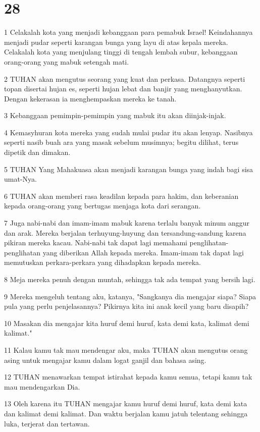 \chapter{28}

\par 1 Celakalah kota yang menjadi kebanggaan para pemabuk Israel! Keindahannya menjadi pudar seperti karangan bunga yang layu di atas kepala mereka. Celakalah kota yang menjulang tinggi di tengah lembah subur, kebanggaan orang-orang yang mabuk setengah mati.
\par 2 TUHAN akan mengutus seorang yang kuat dan perkasa. Datangnya seperti topan disertai hujan es, seperti hujan lebat dan banjir yang menghanyutkan. Dengan kekerasan ia menghempaskan mereka ke tanah.
\par 3 Kebanggaan pemimpin-pemimpin yang mabuk itu akan diinjak-injak.
\par 4 Kemasyhuran kota mereka yang sudah mulai pudar itu akan lenyap. Nasibnya seperti nasib buah ara yang masak sebelum musimnya; begitu dilihat, terus dipetik dan dimakan.
\par 5 TUHAN Yang Mahakuasa akan menjadi karangan bunga yang indah bagi sisa umat-Nya.
\par 6 TUHAN akan memberi rasa keadilan kepada para hakim, dan keberanian kepada orang-orang yang bertugas menjaga kota dari serangan.
\par 7 Juga nabi-nabi dan imam-imam mabuk karena terlalu banyak minum anggur dan arak. Mereka berjalan terhuyung-huyung dan tersandung-sandung karena pikiran mereka kacau. Nabi-nabi tak dapat lagi memahami penglihatan-penglihatan yang diberikan Allah kepada mereka. Imam-imam tak dapat lagi memutuskan perkara-perkara yang dihadapkan kepada mereka.
\par 8 Meja mereka penuh dengan muntah, sehingga tak ada tempat yang bersih lagi.
\par 9 Mereka mengeluh tentang aku, katanya, "Sangkanya dia mengajar siapa? Siapa pula yang perlu penjelasannya? Pikirnya kita ini anak kecil yang baru disapih?
\par 10 Masakan dia mengajar kita huruf demi huruf, kata demi kata, kalimat demi kalimat."
\par 11 Kalau kamu tak mau mendengar aku, maka TUHAN akan mengutus orang asing untuk mengajar kamu dalam logat ganjil dan bahasa asing.
\par 12 TUHAN menawarkan tempat istirahat kepada kamu semua, tetapi kamu tak mau mendengarkan Dia.
\par 13 Oleh karena itu TUHAN mengajar kamu huruf demi huruf, kata demi kata dan kalimat demi kalimat. Dan waktu berjalan kamu jatuh telentang sehingga luka, terjerat dan tertawan.
